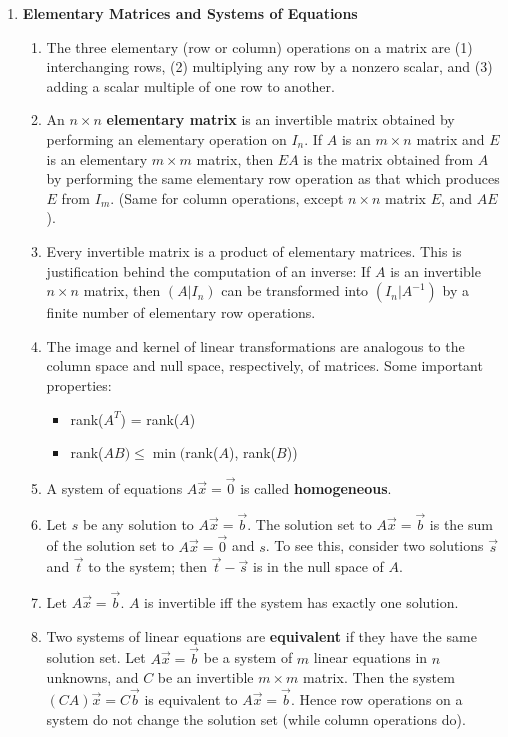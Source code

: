 \documentclass[10pt]{article}
\begin{document}
\begin{multicols*}{2}
\begin{enumerate}
    \item \textbf{Elementary Matrices and Systems of Equations}
    \begin{enumerate}
        \item The three elementary (row or column) operations on a matrix are (1) interchanging rows, (2) multiplying any row by a nonzero scalar, and (3) adding a scalar multiple of one row to another.
        \item An $n \times n$ \textbf{elementary matrix} is an invertible matrix obtained by performing an elementary operation on $I_n$. If $A$ is an $m \times n$ matrix and $E$ is an elementary $m \times m$ matrix, then $EA$ is the matrix obtained from $A$ by performing the same elementary row operation as that which produces $E$ from $I_m$. (Same for column operations, except $n \times n$ matrix $E$, and $AE$).
        \item Every invertible matrix is a product of elementary matrices. This is justification behind the computation of an inverse: If $A$ is an invertible $n \times n$ matrix, then $(A | I_n )$ can be transformed into $(I_n | A^{-1} )$ by a finite number of elementary row operations.
        \item The image and kernel of linear transformations are analogous to the column space and null space, respectively, of matrices. Some important properties:
        \begin{itemize}
            \item rank($A^T$) = rank($A$)
            \item rank($AB) \leq \min($rank($A$), rank($B$))
        \end{itemize}
        \item A system of equations $A\vec{x} = \vec{0}$ is called \textbf{homogeneous}. 
        \item Let $s$ be any solution to $A\vec{x} = \vec{b}$. The solution set to $A\vec{x} = \vec{b}$ is the sum of the solution set to $A\vec{x} = \vec{0}$ and $s$. To see this, consider two solutions $\vec{s}$ and $\vec{t}$ to the system; then $\vec{t} - \vec{s}$ is in the null space of $A$.
        \item Let $A\vec{x} = \vec{b}$. $A$ is invertible iff the system has exactly one solution.
        \item Two systems of linear equations are \textbf{equivalent} if they have the same solution set. Let $A\vec{x}=\vec{b}$ be a system of $m$ linear equations in $n$ unknowns, and $C$ be an invertible $m \times m$ matrix. Then the system $(CA)\vec{x}=C\vec{b}$ is equivalent to $A\vec{x}=\vec{b}$. Hence row operations on a system do not change the solution set (while column operations do).

\end{enumerate}
\end{enumerate}
\end{multicols*}
\end{document}
